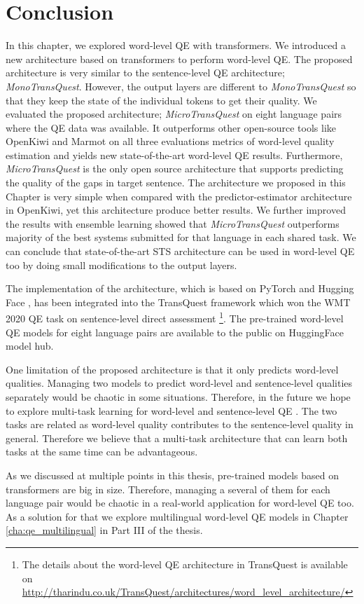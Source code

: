 \section{Conclusion}
In this chapter, we explored word-level QE with transformers. We introduced a new architecture based on transformers to perform word-level QE. The proposed architecture is very similar to the sentence-level QE architecture; \textit{MonoTransQuest}. However, the output layers are different to \textit{MonoTransQuest} so that they keep the state of the individual tokens to get their quality. We evaluated the proposed architecture; \textit{MicroTransQuest} on eight language pairs where the QE data was available.  It outperforms other open-source tools like OpenKiwi and Marmot on all three evaluations metrics of word-level quality estimation and yields new state-of-the-art word-level QE results. Furthermore, \textit{MicroTransQuest} is the only open source architecture that supports predicting the quality of the gaps in target sentence. The architecture we proposed in this Chapter is very simple when compared with the predictor-estimator architecture in OpenKiwi, yet this architecture produce better results. We further improved the results with ensemble learning showed that \textit{MicroTransQuest} outperforms majority of the best systems submitted for that language in each shared task. We can conclude that state-of-the-art STS architecture can be used in word-level QE too by doing small modifications to the output layers.

The implementation of the architecture, which is based on PyTorch \cite{NEURIPS2019_9015} and Hugging Face \cite{wolf-etal-2020-transformers}, has been integrated into the TransQuest framework \cite{ranasinghe-etal-2020-transquest} which won the WMT 2020 QE task \cite{specia-etal-2020-findings-wmt} on sentence-level direct assessment \cite{ranasinghe-etal-2020-transquest-wmt2020}\footnote{The details about the word-level QE architecture in TransQuest is available on \url{http://tharindu.co.uk/TransQuest/architectures/word_level_architecture/}}. The pre-trained word-level QE models for eight language pairs are available to the public on HuggingFace model hub. 

One limitation of the proposed architecture is that it only predicts word-level qualities. Managing two models to predict word-level and sentence-level qualities separately would be chaotic in some situations. Therefore, in the future we hope to explore multi-task learning for word-level and sentence-level QE \cite{Caruana1997}. The two tasks are related as word-level quality contributes to the sentence-level quality in general. Therefore we believe that a multi-task architecture that can learn both tasks at the same time can be advantageous. 

As we discussed at multiple points in this thesis, pre-trained models based on transformers are big in size. Therefore, managing a several of them for each language pair would be chaotic in a real-world application for word-level QE too. As a solution for that we explore multilingual word-level QE models in Chapter \ref{cha:qe_multilingual} in Part III of the thesis.



